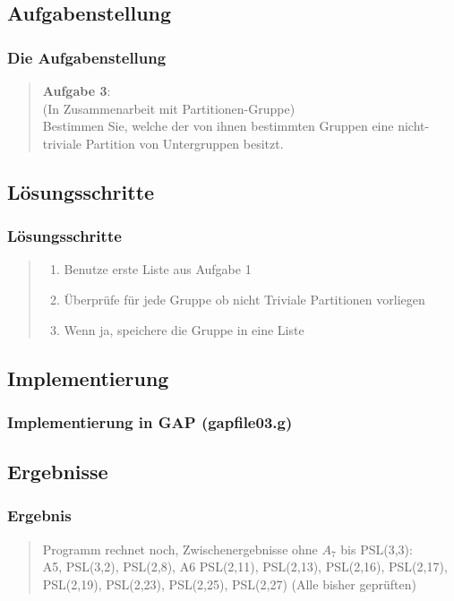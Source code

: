 \documentclass{beamer}
\begin{document}
\subsection{Aufgabenstellung}

\begin{frame}
	\frametitle{Die Aufgabenstellung}
	\begin{quote}
	\textbf{Aufgabe 3}:\\
	(In Zusammenarbeit mit Partitionen-Gruppe)\\
	Bestimmen Sie, welche der von ihnen bestimmten Gruppen eine nicht-triviale Partition von Untergruppen besitzt.

	\end{quote}
\end{frame}
\subsection{Lösungsschritte}

\begin{frame}
	\frametitle{Lösungsschritte}
	\begin{quote}
	 \begin{enumerate}
	  \item Benutze erste Liste aus Aufgabe 1
	  \item Überprüfe für jede Gruppe ob nicht Triviale Partitionen vorliegen
	  \item Wenn ja, speichere die Gruppe in eine Liste
	 \end{enumerate}

		 
	\end{quote}
\end{frame}
\subsection{Implementierung}

\begin{frame}
	\frametitle{Implementierung in GAP (gapfile03.g)}
	\begin{quote}
	 

		 
	\end{quote}
\end{frame}
\subsection{Ergebnisse}

\begin{frame}
	\frametitle{Ergebnis}
	\begin{quote}
	 Programm rechnet noch, Zwischenergebnisse ohne $A_7$ bis PSL(3,3):\\
	 A5, PSL(3,2), PSL(2,8), A6 PSL(2,11), PSL(2,13), PSL(2,16), PSL(2,17), PSL(2,19), PSL(2,23), PSL(2,25), PSL(2,27)  (Alle bisher geprüften)
	 
	 
		 
	\end{quote}
\end{frame}
\end{document}
